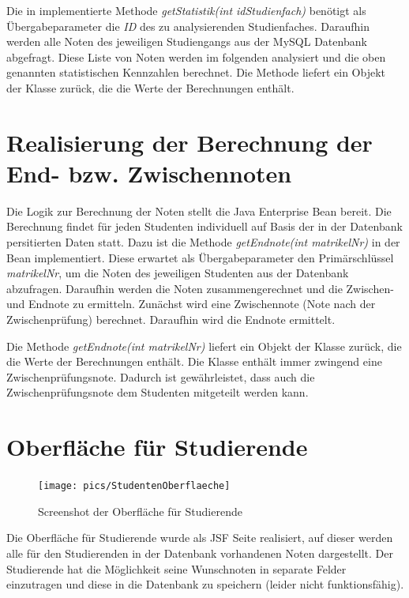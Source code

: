 \documentclass[12pt,a4paper,parskip]{scrreprt}
\begin{document}
Die in  implementierte Methode \textit{getStatistik(int idStudienfach)} benötigt als Übergabeparameter die \textit{ID} des zu analysierenden Studienfaches. Daraufhin werden alle Noten des jeweiligen Studiengangs aus der MySQL Datenbank abgefragt. Diese Liste von Noten werden im folgenden analysiert und die oben genannten statistischen Kennzahlen berechnet. Die Methode liefert ein Objekt der Klasse  zurück, die die Werte der Berechnungen enthält.

\section{Realisierung der Berechnung der End- bzw. Zwischennoten}

Die Logik zur Berechnung der Noten stellt die Java Enterprise Bean  bereit. Die Berechnung findet für jeden Studenten individuell auf Basis der in der Datenbank persitierten Daten statt. 
Dazu ist die Methode \textit{getEndnote(int matrikelNr)} in der Bean implementiert. Diese erwartet als Übergabeparameter den Primärschlüssel \textit{matrikelNr}, um die Noten des jeweiligen Studenten aus der Datenbank abzufragen. Daraufhin werden die Noten zusammengerechnet und die Zwischen- und Endnote zu ermitteln.
Zunächst wird eine Zwischennote (Note nach der Zwischenprüfung) berechnet. Daraufhin wird die Endnote ermittelt.

Die Methode \textit{getEndnote(int matrikelNr)} liefert ein Objekt der Klasse  zurück, die die Werte der Berechnungen enthält. Die Klasse  enthält immer zwingend eine Zwischenprüfungsnote. Dadurch ist gewährleistet, dass auch die Zwischenprüfungsnote dem Studenten mitgeteilt werden kann.

\section{Oberfläche für Studierende}
\begin{figure}[h!]
\centering
\texttt{[image: pics/StudentenOberflaeche]}
\caption[Oberfläche für Studierende]{Screenshot der Oberfläche für Studierende}
\label{fig:StudentenOberfläche}
\end{figure}
Die Oberfläche für Studierende wurde als JSF Seite realisiert, auf dieser werden alle für den Studierenden in der Datenbank vorhandenen Noten dargestellt. Der Studierende hat die Möglichkeit seine Wunschnoten in separate Felder einzutragen und diese in die Datenbank zu speichern (leider nicht funktionsfähig).
\clearpage
\end{document}
